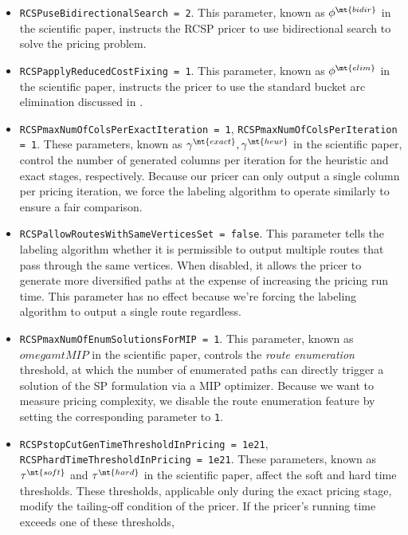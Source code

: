 \begin{itemize}
	\item \texttt{RCSPuseBidirectionalSearch = 2}.
	      This parameter, known as $\phi^\mt{bidir}$ in the scientific paper,
	      instructs the RCSP pricer to use bidirectional search to solve the pricing problem.
	\item \texttt{RCSPapplyReducedCostFixing = 1}.
	      This parameter, known as $\phi^\mt{elim}$ in the scientific paper,
	      instructs the pricer to use the standard bucket arc elimination
	      discussed in \textcite{sadykov2021bucket}.
	\item \texttt{RCSPmaxNumOfColsPerExactIteration = 1}, \texttt{RCSPmaxNumOfColsPerIteration = 1}.
	      These parameters, known as $\gamma^\mt{exact}, \gamma^\mt{heur}$  in the scientific paper,
	      control the number of generated columns per iteration for the heuristic and exact stages, respectively.
	      Because our pricer can only output a single column per pricing iteration,
	      we force the labeling algorithm to operate similarly to ensure a fair comparison.
	\item \texttt{RCSPallowRoutesWithSameVerticesSet = false}.
	      This parameter tells the labeling algorithm whether it is permissible
	      to output multiple routes that pass through the same vertices.
	      When disabled, it allows the pricer to generate more diversified paths
	      at the expense of increasing the pricing run time.
	      This parameter has no effect because we're forcing the labeling algorithm
	      to output a single route regardless.
	\item \texttt{RCSPmaxNumOfEnumSolutionsForMIP = 1}.
	      This parameter, known as $omegamtMIP$ in the scientific paper,
	      controls the \textit{route enumeration} \parencite{baldacci2008} threshold,
	      at which the number of enumerated paths
	      can directly trigger a solution of the SP formulation via a MIP optimizer.
	      Because we want to measure pricing complexity,
	      we disable the route enumeration feature by setting the corresponding parameter to \texttt{1}.
	\item \texttt{RCSPstopCutGenTimeThresholdInPricing = 1e21}, \texttt{RCSPhardTimeThresholdInPricing = 1e21}.
	      These parameters, known as $\tau^\mt{soft}$ and  $\tau^\mt{hard}$ in the scientific paper,
	      affect the soft and hard time thresholds.
	      These thresholds, applicable only during the exact pricing stage,
	      modify the tailing-off condition of the pricer.
	      If the pricer's running time exceeds one of these thresholds,

\end{itemize}
